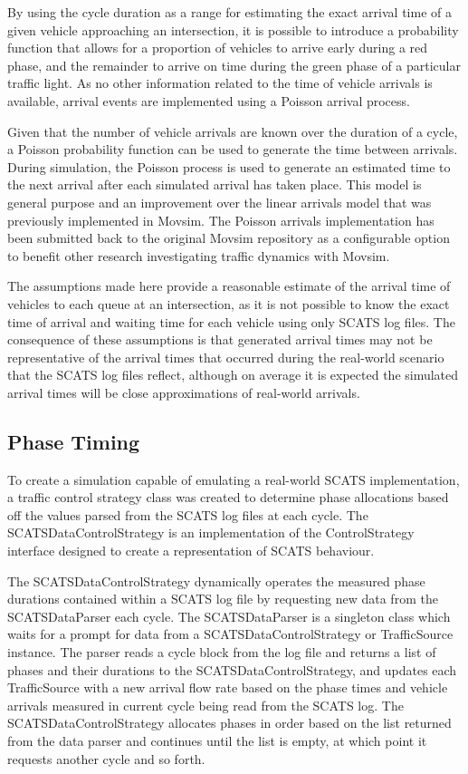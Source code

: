 By using the cycle duration as a range for estimating the exact arrival time of a given vehicle approaching an intersection, it is possible to introduce a probability function that allows for a proportion of vehicles to arrive early during a red phase, and the remainder to arrive on time during the green phase of a particular traffic light. As no other information related to the time of vehicle arrivals is available, arrival events are implemented using a Poisson arrival process. 

Given that the number of vehicle arrivals are known over the duration of a cycle, a Poisson probability function can be used to generate the time between arrivals. During simulation, the Poisson process is used to generate an estimated time to the next arrival after each simulated arrival has taken place. This model is general purpose and an improvement over the linear arrivals model that was previously implemented in Movsim. The Poisson arrivals implementation has been submitted back to the original Movsim repository as a configurable option to benefit other research investigating traffic dynamics with Movsim. 

The assumptions made here provide a reasonable estimate of the arrival time of vehicles to each queue at an intersection, as it is not possible to know the exact time of arrival and waiting time for each vehicle using only SCATS log files. The consequence of these assumptions is that generated arrival times may not be representative of the arrival times that occurred during the real-world scenario that the SCATS log files reflect, although on average it is expected the simulated arrival times will be close approximations of real-world arrivals. 

\subsection{Phase Timing}


To create a simulation capable of emulating a real-world SCATS implementation, a traffic control strategy class was created to determine phase allocations based off the values parsed from the SCATS log files at each cycle. The SCATSDataControlStrategy is an implementation of the ControlStrategy interface designed to create a representation of SCATS behaviour.

The SCATSDataControlStrategy dynamically operates the measured phase durations contained within a SCATS log file by requesting new data from the SCATSDataParser each cycle. The SCATSDataParser is a singleton class which waits for a prompt for data from a SCATSDataControlStrategy or TrafficSource instance. The parser reads a cycle block from the log file and returns a list of phases and their durations to the SCATSDataControlStrategy, and updates each TrafficSource with a new arrival flow rate based on the phase times and vehicle arrivals measured in current cycle being read from the SCATS log. The SCATSDataControlStrategy allocates phases in order based on the list returned from the data parser and continues until the list is empty, at which point it requests another cycle and so forth.

